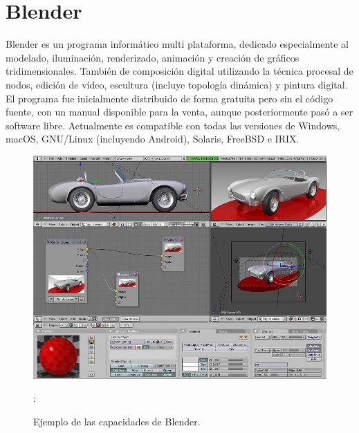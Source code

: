 \documentclass[11pt,a4paper,oldfontcommands,oneside]{memoir}
\begin{document}
\vspace{.5cm}
\hfill\break




\tableofcontents*

\clearpage

\chapter{Blender}
Blender es un programa informático multi plataforma, dedicado especialmente al modelado, iluminación, renderizado, animación y creación de gráficos tridimensionales. También de composición digital utilizando la técnica procesal de nodos, edición de vídeo, escultura (incluye topología dinámica) y pintura digital.\\ 

El programa fue inicialmente distribuido de forma gratuita pero sin el código fuente, con un manual disponible para la venta, aunque posteriormente pasó a ser software libre. Actualmente es compatible con todas las versiones de Windows, macOS, GNU/Linux (incluyendo Android), Solaris, FreeBSD e IRIX. \\

\begin{figure}
\begin{center}
\includegraphics[scale=.4]{blender.jpg}
\end{center}
\caption{Ejemplo de las capacidades de Blender.}
\label{blender}:
\end{figure}
\end{document}
